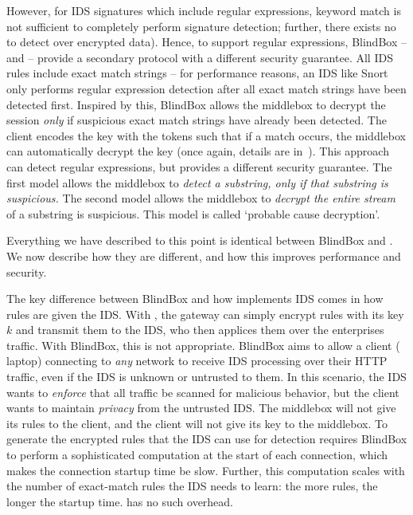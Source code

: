   However, for IDS signatures which include regular expressions, keyword match is not sufficient to completely perform signature detection; further, there exists no  to detect over encrypted data).
  Hence, to support regular expressions, BlindBox -- and \sys -- provide a secondary protocol with a different security guarantee. 
  All IDS rules include exact match strings -- for performance reasons, an IDS like Snort~\cite{Snort} only performs regular expression detection after all exact match strings have been detected first.
  Inspired by this, BlindBox allows the middlebox to decrypt the session {\it only} if suspicious exact match strings have already been detected.
  The client encodes the key with the tokens such that if a match occurs, the middlebox can automatically decrypt the key (once again, details are in~\cite{blindbox}).
  This approach can detect regular expressions, but provides a different security guarantee. 
  The first model allows the middlebox to {\it detect a substring, only if that substring is suspicious.} 
  The second model allows the middlebox to {\it decrypt the entire stream} of a substring is suspicious.
  This model is called `probable cause decryption'.

  Everything we have described to this point is identical between BlindBox and \sys. We now describe how they are different, and how this improves performance and security.

The key difference between BlindBox and how \sys implements IDS comes in how rules are given the IDS.
With \sys, the gateway can simply encrypt rules with its key $k$ and transmit them to the IDS, who then applices them over the enterprises traffic.
With BlindBox, this is not appropriate.
BlindBox aims to allow a client (\eg{} laptop) connecting to {\em any} network to receive IDS processing over their HTTP traffic, even if the IDS is unknown or untrusted to them.
In this scenario, the IDS wants to {\it enforce} that all traffic be scanned for malicious behavior, but the client wants to maintain {\it privacy} from the untrusted IDS.
The middlebox will not give its rules to the client, and the client will not give its key to the middlebox.
 To generate the encrypted rules that the IDS can use for detection requires BlindBox to perform
a sophisticated computation at the start of each connection, which makes the connection
startup time be slow. 
Further, this computation scales with the number of exact-match rules the IDS needs to learn: the more rules, the longer the startup time.
\sys has no such overhead.

